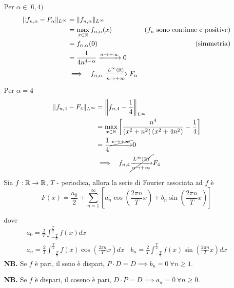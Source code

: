\begin{enumerate}
Per $\alpha \in [ 0,4)$\begin{equation*}
\begin{aligned}
\Vert f_{n,\alpha } - F_{\alpha }\Vert _{L^{\infty }} & = \Vert f_{n,\alpha }\Vert _{L^{\infty }} & \\
 & = \max_{x\in \mathbb{R} } f_{n,\alpha }(x) & \left(f_{n} \ \text{sono continue e positive}\right)\\
 & = f_{n,\alpha }(0) & \text{(simmetria)}\\
 & = \frac{1}{4n^{4 - \alpha }}\xrightarrow{n\rightarrow + \infty } 0 & \\
 & \implies \ \ f_{n,\alpha }\xrightarrow[n\rightarrow + \infty ]{L^{\infty }(\mathbb{R})} F_{\alpha } & 
\end{aligned}
\end{equation*}Per $\alpha = 4$\begin{equation*}
\begin{aligned}
\Vert f_{n,4} - F_{4}\Vert _{L^{\infty }} & = \left\Vert f_{n,4} - \frac{1}{4}\right\Vert _{L^{\infty }}\\
 & = \max_{x\in \mathbb{R} }\left[\frac{n^{4}}{\left(x^{2} + n^{2}\right)\left(x^{2} + 4n^{2}\right)} - \frac{1}{4}\right]\\
 & = \frac{1}{4}\cancel{\xrightarrow{n\rightarrow + \infty }} 0\\
 & \implies \ \ f_{n,4}\cancel{\xrightarrow[n\rightarrow + \infty ]{L^{\infty }(\mathbb{R})}} F_{4}
\end{aligned}
\end{equation*}
\end{enumerate}
\Soluzione
\begin{thm}
Sia $f:\mathbb{R} \rightarrow \mathbb{R} $, $T$ - periodica, allora la serie di Fourier associata ad $f$ è\begin{equation*}
F(x) = \frac{a_{0}}{2} + \sum\limits ^{\infty }_{n = 1}\left[ a_{n}\cos\left(\frac{2\pi n}{T} x\right) + b_{n}\sin\left(\frac{2\pi n}{T} x\right)\right]
\end{equation*}

dove
\begin{gather*}
a_{0} = \frac{2}{T}\int ^{\frac{T}{2}}_{ - \frac{T}{2}} f(x) dx\\
a_{n} = \frac{2}{T}\int ^{\frac{T}{2}}_{ - \frac{T}{2}} f(x)\cos\left(\frac{2\pi n}{T} x\right) dx\ \ \ \ b_{n} = \frac{2}{T}\int ^{\frac{T}{2}}_{ - \frac{T}{2}} f(x)\sin\left(\frac{2\pi n}{T} x\right) dx
\end{gather*}
\textbf{NB.} Se $f$ è pari, il seno è dispari, $P\cdot D = D\implies b_{n} = 0\ \forall n\geq 1$.

\textbf{NB.} Se $f$ è dispari, il coseno è pari, $D\cdot P = D\implies a_{n} = 0\ \forall n\geq 0$.
\end{thm}
